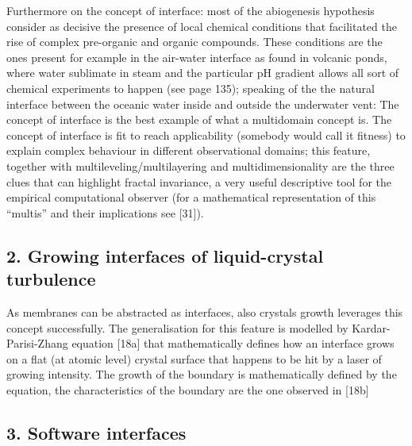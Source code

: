 \documentclass[14pt,a4paper]{extarticle}
\begin{document}
Furthermore on the concept of interface: most of the abiogenesis hypothesis \cite{lingam2021life} consider as decisive the presence of local chemical conditions that facilitated the rise of complex pre-organic and organic compounds. These conditions are the ones present for example in the air-water interface as found in volcanic ponds, where water sublimate in steam and the particular pH gradient allows all sort of chemical experiments to happen (see \cite{lingam2021life} page 135); speaking of the the natural interface between the oceanic water inside and outside the underwater vent: 
\newline
\hspace*{15mm}The concept of interface is the best example of what a multidomain concept is. The concept of interface is fit to reach applicability (somebody would call it fitness) to explain complex behaviour in different observational domains; this feature, together with multileveling/multilayering and multidimensionality are the three clues that can highlight fractal invariance, a very useful descriptive tool for the empirical computational observer (for a mathematical representation of this “multis” and their implications see [31]).

\subsection*{2. Growing interfaces of liquid-crystal turbulence}
\label{subsec:crystals}
    
\hspace*{15mm}As membranes can be abstracted as interfaces, also crystals growth leverages this concept successfully. The generalisation for this feature is modelled by Kardar-Parisi-Zhang equation [18a] that mathematically defines how an interface grows on a flat (at atomic level) crystal surface that happens to be hit by a laser of growing intensity. The growth of the boundary is mathematically defined by the equation, the characteristics of the boundary are the one observed in [18b]

\subsection*{3. Software interfaces}
\label{subsec:software}
\end{document}
